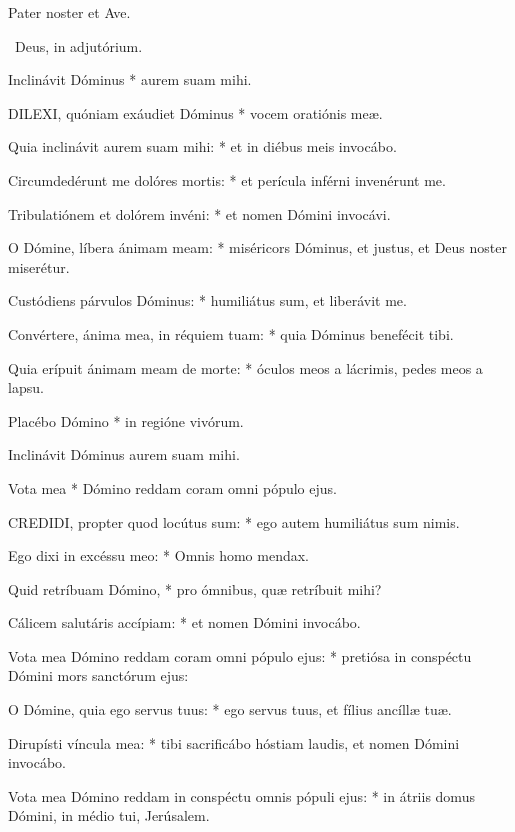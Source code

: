 Pater noster et Ave.

\V\ Deus, in adjutórium.

 Inclinávit Dóminus * aurem suam mihi.



\lettrine[lines=2]{D}{ILEXI}, quóniam exáudiet Dóminus * vocem oratiónis meæ.

Quia inclinávit aurem suam mihi: * et in diébus meis invocábo.

Circumdedérunt me dolóres mortis: * et perícula inférni invenérunt me.

Tribulatiónem et dolórem invéni: * et nomen Dómini invocávi.

O Dómine, líbera ánimam meam: * miséricors Dóminus, et justus, et Deus noster miserétur.

Custódiens párvulos Dóminus: * humiliátus sum, et liberávit me.

Convértere, ánima mea, in réquiem tuam: * quia Dóminus benefécit tibi.

Quia erípuit ánimam meam de morte: * óculos meos a lácrimis, pedes meos a lapsu.

Placébo Dómino * in regióne vivórum.

 Inclinávit Dóminus aurem suam mihi.

 Vota mea * Dómino reddam coram omni pópulo ejus.


\lettrine[lines=2]{C}{REDIDI}, propter quod locútus sum: * ego autem humiliátus sum nimis.

Ego dixi in excéssu meo: * Omnis homo mendax.

Quid retríbuam Dómino, * pro ómnibus, quæ retríbuit mihi?

Cálicem salutáris accípiam: * et nomen Dómini invocábo.

Vota mea Dómino reddam coram omni pópulo ejus: * pretiósa in conspéctu Dómini mors sanctórum ejus:

O Dómine, quia ego servus tuus: * ego servus tuus, et fílius ancíllæ tuæ.

Dirupísti víncula mea: * tibi sacrificábo hóstiam laudis, et nomen Dómini invocábo.

Vota mea Dómino reddam in conspéctu omnis pópuli ejus: * in átriis domus Dómini, in médio tui, Jerúsalem.

